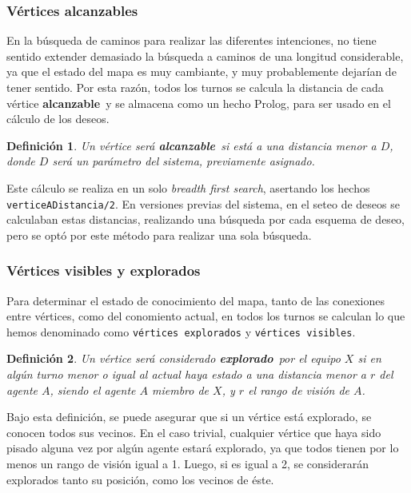 \documentclass[oneside]{book}
\newtheorem{definicion}{Definición}
\begin{document}
\subsubsection{Vértices alcanzables}

En la búsqueda de caminos para realizar las diferentes intenciones, no tiene sentido
extender demasiado la búsqueda a caminos de una longitud considerable, ya que el 
estado del mapa es muy cambiante, y muy probablemente dejarían de tener sentido. Por
esta razón, todos los turnos se calcula la distancia de cada vértice 
\textbf{alcanzable}\ y se almacena como un hecho Prolog, para ser usado en el 
cálculo de los deseos.

\begin{definicion}
Un vértice será \textbf{alcanzable}\ si está a una distancia menor a $D$, donde $D$
será un parámetro del sistema, previamente asignado.
\end{definicion}

Este cálculo se realiza en un solo \textit{breadth first search}, asertando los hechos
\texttt{verticeADistancia/2}. En versiones previas del sistema, en el seteo de deseos
se calculaban estas distancias, realizando una búsqueda por cada esquema de deseo, 
pero se optó por este método para realizar una sola búsqueda.


\subsubsection{Vértices visibles y explorados}

Para determinar el estado de conocimiento del mapa, tanto de las conexiones
entre vértices, como del conomiento actual, en todos los turnos se calculan
lo que hemos denominado como \texttt{vértices explorados} y \texttt{vértices 
visibles}. 

\begin{definicion}
Un vértice será considerado \textbf{explorado}\ por el equipo $X$ si en algún 
turno menor o igual al actual haya estado a una distancia menor a $r$ del agente
$A$, siendo el agente $A$ miembro de $X$, y $r$ el rango de visión de $A$.
\end{definicion}

Bajo esta definición, se puede asegurar que si un vértice está explorado, se 
conocen todos sus vecinos. En el caso trivial, cualquier vértice que haya sido
pisado alguna vez por algún agente estará explorado, ya que todos tienen por lo 
menos un rango de visión igual a 1. Luego, si es igual a 2, se considerarán
explorados tanto su posición, como los vecinos de éste.
\end{document}

